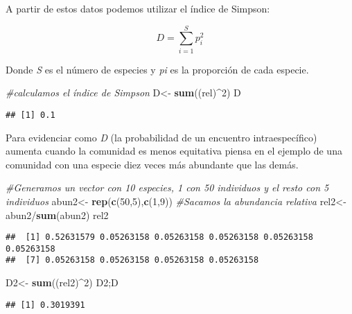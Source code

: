 \documentclass[]{book}
\newenvironment{Shaded}{\begin{snugshade}}{\end{snugshade}}
\newcommand{\KeywordTok}[1]{\textcolor[rgb]{0.13,0.29,0.53}{\textbf{{#1}}}}
\newcommand{\DecValTok}[1]{\textcolor[rgb]{0.00,0.00,0.81}{{#1}}}
\newcommand{\StringTok}[1]{\textcolor[rgb]{0.31,0.60,0.02}{{#1}}}
\newcommand{\CommentTok}[1]{\textcolor[rgb]{0.56,0.35,0.01}{\textit{{#1}}}}
\newcommand{\NormalTok}[1]{{#1}}
\begin{document}
A partir de estos datos podemos utilizar el índice de Simpson:

\[
D=\sum_{i=1}^S p_i^2
\]

Donde \emph{S} es el número de especies y \emph{pi} es la proporción de
cada especie.

\begin{Shaded}
\begin{Highlighting}[]
\CommentTok{#calculamos el índice de Simpson}
\NormalTok{D<-}\StringTok{ }\KeywordTok{sum}\NormalTok{((rel)^}\DecValTok{2}\NormalTok{)}
\NormalTok{D}
\end{Highlighting}
\end{Shaded}

\begin{verbatim}
## [1] 0.1
\end{verbatim}

Para evidenciar como \emph{D} (la probabilidad de un encuentro
intraespecífico) aumenta cuando la comunidad es menos equitativa piensa
en el ejemplo de una comunidad con una especie diez veces más abundante
que las demás.

\begin{Shaded}
\begin{Highlighting}[]
\CommentTok{#Generamos un vector con 10 especies, 1 con 50 individuos y el resto con 5 individuos}
\NormalTok{abun2<-}\StringTok{ }\KeywordTok{rep}\NormalTok{(}\KeywordTok{c}\NormalTok{(}\DecValTok{50}\NormalTok{,}\DecValTok{5}\NormalTok{),}\KeywordTok{c}\NormalTok{(}\DecValTok{1}\NormalTok{,}\DecValTok{9}\NormalTok{))}
\CommentTok{#Sacamos la abundancia relativa}
\NormalTok{rel2<-}\StringTok{ }\NormalTok{abun2/}\KeywordTok{sum}\NormalTok{(abun2)}
\NormalTok{rel2}
\end{Highlighting}
\end{Shaded}

\begin{verbatim}
##  [1] 0.52631579 0.05263158 0.05263158 0.05263158 0.05263158 0.05263158
##  [7] 0.05263158 0.05263158 0.05263158 0.05263158
\end{verbatim}

\begin{Shaded}
\begin{Highlighting}[]
\NormalTok{D2<-}\StringTok{ }\KeywordTok{sum}\NormalTok{((rel2)^}\DecValTok{2}\NormalTok{)}
\NormalTok{D2;D}
\end{Highlighting}
\end{Shaded}

\begin{verbatim}
## [1] 0.3019391
\end{verbatim}
\end{document}
